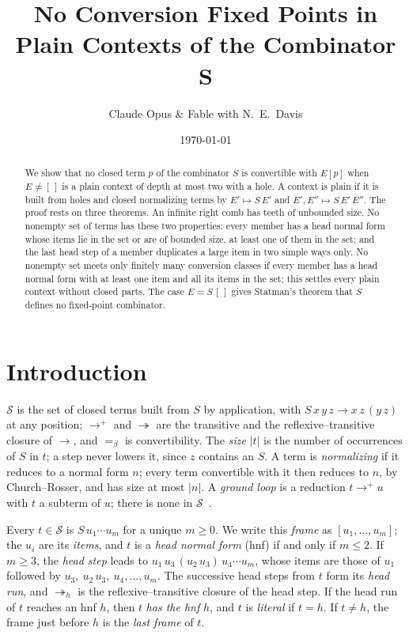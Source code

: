 \documentclass[11pt]{amsart}
\title[No Conversion Fixed Points in Plain Contexts]{No Conversion Fixed Points in Plain Contexts of the Combinator $\bm{S}$}
\author{Claude Opus \& Fable with N.\ E.\ Davis}
\date{\today}
\newcommand{\Ter}{\mathcal S}
\newcommand{\red}{\twoheadrightarrow}
\newcommand{\hred}{\twoheadrightarrow_h}
\newcommand{\conv}{=_\beta}
\newcommand{\sz}[1]{\lvert#1\rvert}
\newcommand{\fr}[1]{[#1]}
\begin{document}
\begin{abstract}
We show that no closed term $p$ of the combinator $S$ is convertible with $E[p]$ when $E\ne[\,]$
is a plain context of depth at most two with a hole. A context is plain if it is built from holes
and closed normalizing terms by $E'\mapsto S\,E'$ and $E',E''\mapsto S\,E'\,E''$. The proof rests
on three theorems. An infinite right comb has teeth of unbounded size. No nonempty set of terms
has these two properties: every member has a head normal form whose items lie in the set or are of
bounded size, at least one of them in the set; and the last head step of a member duplicates a
large item in two simple ways only. No nonempty set meets only finitely many conversion classes if
every member has a head normal form with at least one item and all its items in the set; this
settles every plain context without closed parts. The case $E=S\,[\,]$ gives Statman's theorem that
$S$ defines no fixed-point combinator.
\end{abstract}

\maketitle

\section{Introduction}

$\Ter$ is the set of closed terms built from $S$ by application, with $S\,x\,y\,z\to x\,z\,(y\,z)$ at
any position; $\to^+$ and $\red$ are the transitive and the reflexive--transitive closure of $\to$,
and $\conv$ is convertibility. The
\emph{size} $\sz t$ is the number of occurrences of $S$ in $t$; a step never lowers it, since $z$
contains an $S$. A term is \emph{normalizing} if it reduces to a normal form $n$; every term
convertible with it then reduces to $n$, by Church--Rosser, and has size at most $\sz n$. A
\emph{ground loop} is a reduction $t\to^+u$ with $t$ a subterm of $u$; there is none in
$\Ter$~\citep{waldmann-ic,s7}.

Every $t\in\Ter$ is $S\,u_1\cdots u_m$ for a unique $m\ge0$. We write this \emph{frame} as
$\fr{u_1,\dots,u_m}$; the $u_i$ are its \emph{items}, and $t$ is a \emph{head normal form} (hnf)
if and only if $m\le2$. If $m\ge3$, the \emph{head step} leads to $u_1\,u_3\,(u_2\,u_3)\,u_4\cdots u_m$, whose
items are those of $u_1$ followed by $u_3,\ u_2\,u_3,\ u_4,\dots,u_m$. The successive head steps
from $t$ form its \emph{head run}, and $\hred$ is the reflexive--transitive closure of the head
step. If the head run of $t$ reaches an hnf $h$, then $t$ \emph{has the hnf} $h$, and $t$ is
\emph{literal} if $t=h$. If $t\ne h$, the frame just before $h$ is the \emph{last frame} of $t$.
\end{document}
